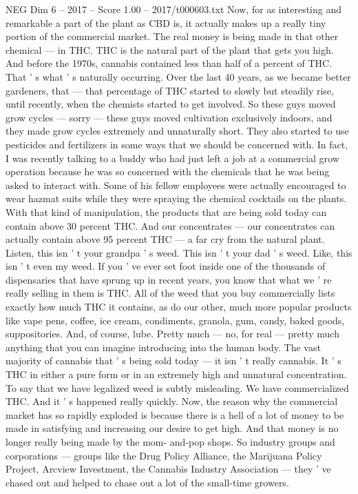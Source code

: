 \begin{textsample}{NEG Dim 6 – 2017 – Score 1.00 – 2017/t000603.txt}
Now, for as interesting and remarkable a part of the plant as CBD is, it actually makes up a really tiny portion of the commercial market.
The real money is being made in that other chemical — in THC.
THC is the natural part of the plant that gets you high.
And before the 1970s, cannabis contained less than half of a percent of THC.
That ' s what ' s naturally occurring.
Over the last 40 years, as we became better gardeners, that — that percentage of THC started to slowly but steadily rise, until recently, when the chemists started to get involved.
So these guys moved grow cycles — sorry — these guys moved cultivation exclusively indoors, and they made grow cycles extremely and unnaturally short.
They also started to use pesticides and fertilizers in some ways that we should be concerned with.
In fact, I was recently talking to a buddy who had just left a job at a commercial grow operation because he was so concerned with the chemicals that he was being asked to interact with.
Some of his fellow employees were actually encouraged to wear hazmat suits while they were spraying the chemical cocktails on the plants.
With that kind of manipulation, the products that are being sold today can contain above 30 percent THC.
And our concentrates — our concentrates can actually contain above 95 percent THC — a far cry from the natural plant.
Listen, this isn ' t your grandpa ' s weed.
This isn ' t your dad ' s weed.
Like, this isn ' t even my weed.
If you ' ve ever set foot inside one of the thousands of dispensaries that have sprung up in recent years, you know that what we ' re really selling in them is THC.
All of the weed that you buy commercially lists exactly how much THC it contains, as do our other, much more popular products like vape pens, coffee, ice cream, condiments, granola, gum, candy, baked goods, suppositories.
And, of course, lube.
Pretty much — no, for real — pretty much anything that you can imagine introducing into the human body.
The vast majority of cannabis that ' s being sold today — it isn ' t really cannabis.
It ' s THC in either a pure form or in an extremely high and unnatural concentration.
To say that we have legalized weed is subtly misleading.
We have commercialized THC.
And it ' s happened really quickly.
Now, the reason why the commercial market has so rapidly exploded is because there is a hell of a lot of money to be made in satisfying and increasing our desire to get high.
And that money is no longer really being made by the mom- and-pop shops.
So industry groups and corporations — groups like the Drug Policy Alliance, the Marijuana Policy Project, Arcview Investment, the Cannabis Industry Association — they ' ve chased out and helped to chase out a lot of the small-time growers.

\end{textsample}
